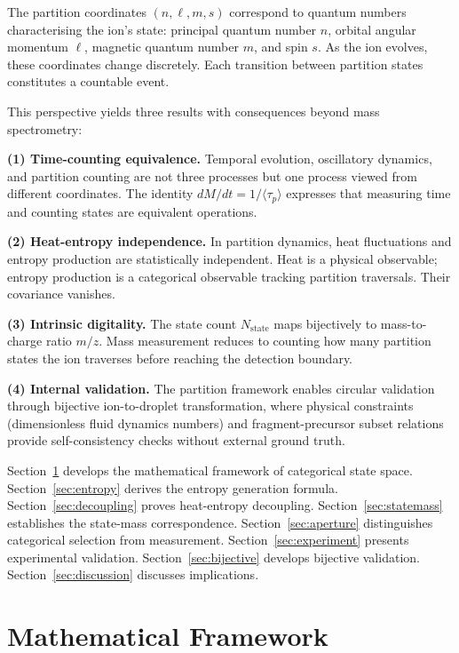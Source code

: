 \documentclass[twocolumn,10pt]{article}
\newcommand{\Nstate}{N_{\mathrm{state}}}
\begin{document}
The partition coordinates $(n, \ell, m, s)$ correspond to quantum numbers characterising the ion's state: principal quantum number $n$, orbital angular momentum $\ell$, magnetic quantum number $m$, and spin $s$. As the ion evolves, these coordinates change discretely. Each transition between partition states constitutes a countable event.

This perspective yields three results with consequences beyond mass spectrometry:

\textbf{(1) Time-counting equivalence.} Temporal evolution, oscillatory dynamics, and partition counting are not three processes but one process viewed from different coordinates. The identity $dM/dt = 1/\langle\tau_p\rangle$ expresses that measuring time and counting states are equivalent operations.

\textbf{(2) Heat-entropy independence.} In partition dynamics, heat fluctuations and entropy production are statistically independent. Heat is a physical observable; entropy production is a categorical observable tracking partition traversals. Their covariance vanishes.

\textbf{(3) Intrinsic digitality.} The state count $\Nstate$ maps bijectively to mass-to-charge ratio $m/z$. Mass measurement reduces to counting how many partition states the ion traverses before reaching the detection boundary.

\textbf{(4) Internal validation.} The partition framework enables circular validation through bijective ion-to-droplet transformation, where physical constraints (dimensionless fluid dynamics numbers) and fragment-precursor subset relations provide self-consistency checks without external ground truth.

Section~\ref{sec:framework} develops the mathematical framework of categorical state space. Section~\ref{sec:entropy} derives the entropy generation formula. Section~\ref{sec:decoupling} proves heat-entropy decoupling. Section~\ref{sec:statemass} establishes the state-mass correspondence. Section~\ref{sec:aperture} distinguishes categorical selection from measurement. Section~\ref{sec:experiment} presents experimental validation. Section~\ref{sec:bijective} develops bijective validation. Section~\ref{sec:discussion} discusses implications.

\section{Mathematical Framework}
\label{sec:framework}
\end{document}
